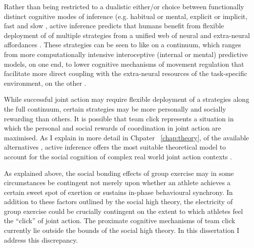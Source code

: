 \begin{CJK}{UTF8}{gbsn}
Rather than being restricted to a dualistic either/or choice between functionally distinct cognitive modes of inference (e.g. habitual or mental, explicit or implicit, fast and slow \citep[cf.][]{Dienes1999,Kahneman2011}, active inference predicts that humans benefit from flexible deployment of of multiple strategies from a unified web of neural and extra-neural affordances \citep{Pezzulo2013,Clark2015}.  These strategies can be seen to like on a continuum, which ranges from more computationally intensive interoceptive (internal or mental) predictive models, on one end, to lower cognitive mechanisms of movement regulation that facilitate more direct coupling with the extra-neural resources of the task-specific environment, on the other \citep{Riley2011}.

While successful joint action may require flexible deployment of a strategies along the full continuum, certain strategies may be more personally and socially rewarding than others.  It is possible that team click represents a situation in which the personal and social rewards of coordination in joint action are maximised. As I explain in more detail in Chpater ~\ref{chap:theory}, of the available alternatives \citep[see, for example,][]{Keller2016}, active inference offers the most suitable theoretical model to account for the social cognition of complex real world joint action contexts \citep{Friston2015,Pesquita2017}.

As explained above, the social bonding effects of group exercise may in some circumstances be contingent not merely upon whether an athlete achieves a certain sweet spot of exertion or sustains in-phase behavioural synchrony.  In addition to these factors outlined by the social high theory, the electricity of group exercise could be crucially contingent on the extent to which athletes feel the ``click'' of joint action.  The proximate cognitive mechanisms of team click currently lie outside the bounds of the social high theory.  In this dissertation I address this discrepancy.



\end{CJK}
